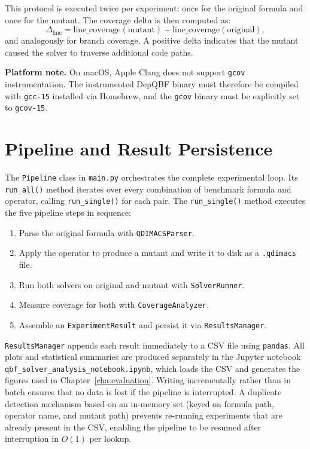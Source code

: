 This protocol is executed twice per experiment: once for the original formula and once for the mutant. The coverage delta is then computed as:
\[
  \Delta_{\text{line}} = \text{line\_coverage}(\text{mutant}) - \text{line\_coverage}(\text{original}),
\]
and analogously for branch coverage. A positive delta indicates that the mutant caused the solver to traverse additional code paths.

\textbf{Platform note.} On macOS, Apple Clang does not support \texttt{gcov} instrumentation. The instrumented DepQBF binary must therefore be compiled with \texttt{gcc-15} installed via Homebrew, and the \texttt{gcov} binary must be explicitly set to \texttt{gcov-15}.

\section{Pipeline and Result Persistence}\label{sec:pipeline-impl}

The \texttt{Pipeline} class in \texttt{main.py} orchestrates the complete experimental loop. Its \texttt{run\_all()} method iterates over every combination of benchmark formula and operator, calling \texttt{run\_single()} for each pair. The \texttt{run\_single()} method executes the five pipeline steps in sequence:

\begin{enumerate}
  \item Parse the original formula with \texttt{QDIMACSParser}.
  \item Apply the operator to produce a mutant and write it to disk as a \texttt{.qdimacs} file.
  \item Run both solvers on original and mutant with \texttt{SolverRunner}.
  \item Measure coverage for both with \texttt{CoverageAnalyzer}.
  \item Assemble an \texttt{ExperimentResult} and persist it via \texttt{ResultsManager}.
\end{enumerate}

\texttt{ResultsManager} appends each result immediately to a CSV file using \texttt{pandas}. 
All plots and statistical summaries are produced separately in the Jupyter notebook \texttt{qbf\_solver\_analysis\_\allowbreak notebook.ipynb}, which loads the CSV and generates the figures used in Chapter~\ref{cha:evaluation}. 
Writing incrementally rather than in batch ensures that no data is lost if the pipeline is interrupted. 
A duplicate detection mechanism based on an in-memory set (keyed on formula path, operator name, and mutant path) prevents re-running experiments that are already present in the CSV, enabling the pipeline to be resumed after interruption in $O(1)$ per lookup.

